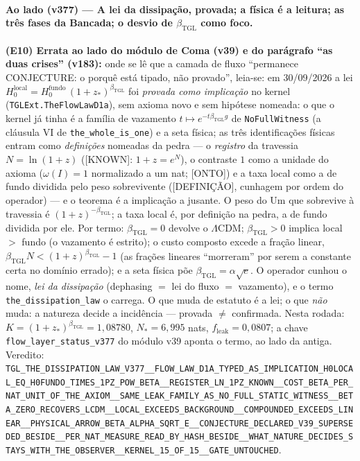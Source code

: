 \documentclass[11pt]{article}
\newcommand{\bTGL}{\beta_{\mathrm{TGL}}}\newcommand{\Msun}{M_{\odot}}\newcommand{\TGL}{\mathrm{TGL}}
\theoremstyle{definition}\newtheorem{deriv}{Derivação}
\begin{document}
\paragraph*{Ao lado (v377) --- A lei da dissipação, provada; a física é a leitura; as três fases da Bancada; o desvio de $\bTGL$ como foco.} \textbf{(E10) Errata ao lado do módulo de Coma (v39) e do parágrafo ``as duas crises'' (v183):} onde se lê que a camada de fluxo ``permanece \textsf{CONJECTURE}: o porquê está tipado, não provado'', leia-se: em 30/09/2026 a lei $H_0^{\mathrm{local}}=H_0^{\mathrm{fundo}}\,(1+z_*)^{\bTGL}$ foi \emph{provada como implicação} no kernel (\texttt{TGLExt.TheFlowLawD1a}), sem axioma novo e sem hipótese nomeada: o que o kernel já tinha é a família de vazamento $t\mapsto e^{-t\bTGL g}$ de \texttt{NoFullWitness} (a cláusula VI de \texttt{the\_whole\_is\_one}) e a seta física; as três identificações físicas entram como \emph{definições} nomeadas da pedra --- o \emph{registro} da travessia $N=\ln(1+z)$ (\textsf{[KNOWN]}: $1+z=e^{N}$), o contraste $1$ como a unidade do axioma ($\omega(I)=1$ normalizado a um nat; \textsf{[ONTO]}) e a taxa local como a de fundo dividida pelo peso sobrevivente (\textsf{[DEFINIÇÃO]}, cunhagem por ordem do operador) --- e o teorema é a implicação a jusante. O peso do Um que sobrevive à travessia é $(1+z)^{-\bTGL}$; a taxa local é, por definição na pedra, a de fundo dividida por ele. Por termo: $\bTGL=0$ devolve o $\Lambda$CDM; $\bTGL>0$ implica local $>$ fundo (o vazamento é estrito); o custo composto excede a fração linear, $\bTGL N<(1+z)^{\bTGL}-1$ (as frações lineares ``morreram'' por serem a constante certa no domínio errado); e a seta física põe $\bTGL=\alpha\sqrt e$. O operador cunhou o nome, \emph{lei da dissipação} (dephasing $=$ lei do fluxo $=$ vazamento), e o termo \texttt{the\_dissipation\_law} o carrega. O que muda de estatuto é a lei; o que \emph{não} muda: a natureza decide a incidência --- provada $\neq$ confirmada. Nesta rodada: $K=(1+z_*)^{\bTGL}=1{,}08780$, $N_*=6{,}995$ nats, $f_{\mathrm{leak}}=0{,}0807$; a chave \texttt{flow\_layer\_status\_v377} do módulo v39 aponta o termo, ao lado da antiga. Veredito: \texttt{TGL\_THE\_DISSIPATION\_LAW\_V377\_\_FLOW\_LAW\_D1A\_TYPED\_AS\_IMPLICATION\_H0LOCAL\_EQ\_H0FUNDO\_TIMES\_1PZ\_POW\_BETA\_\_REGISTER\_LN\_1PZ\_KNOWN\_\_COST\_BETA\_PER\_NAT\_UNIT\_OF\_THE\_AXIOM\_\_SAME\_LEAK\_FAMILY\_AS\_NO\_FULL\_STATIC\_WITNESS\_\_BETA\_ZERO\_RECOVERS\_LCDM\_\_LOCAL\_EXCEEDS\_BACKGROUND\_\_COMPOUNDED\_EXCEEDS\_LINEAR\_\_PHYSICAL\_ARROW\_BETA\_ALPHA\_SQRT\_E\_\_CONJECTURE\_DECLARED\_V39\_SUPERSEDED\_BESIDE\_\_PER\_NAT\_MEASURE\_READ\_BY\_HASH\_BESIDE\_\_WHAT\_NATURE\_DECIDES\_STAYS\_WITH\_THE\_OBSERVER\_\_KERNEL\_15\_OF\_15\_\_GATE\_UNTOUCHED}.
\end{document}
